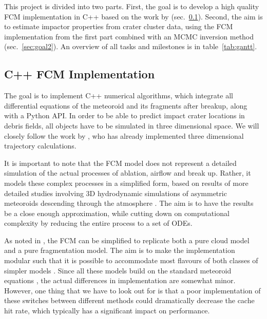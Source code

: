 This project is divided into two parts.
First, the goal is to develop a high quality FCM implementation in C++ based on the work by \cite{newland2019CFM18} (sec.~\ref{sec:goal1}).
Second, the aim is to estimate impactor properties from crater cluster data, using the FCM implementation from the first part combined with an MCMC inversion method (sec.~\ref{sec:goal2}).
An overview of all tasks and milestones is in table~\ref{tab:gantt}.

\subsection{C++ FCM Implementation}
\label{sec:goal1}
The goal is to implement C++ numerical algorithms, which integrate all differential equations of the meteoroid and its fragments after breakup, along with a Python API.
In order to be able to predict impact crater locations in debris fields, all objects have to be simulated in three dimensional space.
We will closely follow the work by \cite{newland2019CFM18}, who has already implemented three dimensional trajectory calculations.

It is important to note that the FCM model does not represent a detailed simulation of the actual processes of ablation, airflow and break up.
Rather, it models these complex processes in a simplified form, based on results of more detailed studies involving 3D hydrodynamic simulations of asymmetric meteoroids descending through the atmosphere \citep[e.g.][]{artemieva1996interaction,artemieva2001motion}.
The aim is to have the results be a close enough approximation, while cutting down on computational complexity by reducing the entire process to a set of ODEs.

As noted in \cite{newland2019CFM18}, the FCM can be simplified to replicate both a pure cloud model and a pure fragmentation model.
The aim is to make the implementation modular such that it is possible to accommodate most flavours of both classes of simpler models \cite{artemieva1996interaction,artemieva2001motion,register2017asteroid,mcmullan2019uncertainty}.
Since all these models build on the standard meteoroid equations \citep[e.g.][]{opik1958physics}, the actual differences in implementation are somewhat minor.
However, one thing that we have to look out for is that a poor implementation of these switches between different methods could dramatically decrease the cache hit rate, which typically has a significant impact on performance.

